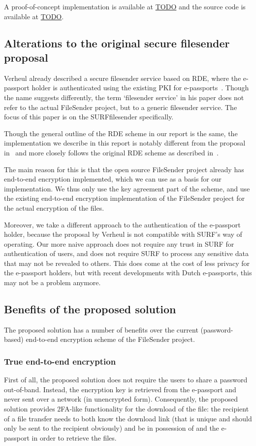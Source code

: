 A proof-of-concept implementation is available at \url{TODO} and the source code is available at \url{TODO}.

\subsection{Alterations to the original secure filesender proposal}\label{subsec:alterations-to-the-rde-scheme}
Verheul already described a secure filesender service based on RDE, where the e-passport holder is authenticated using the existing PKI for e-passports~\cite{verheul2020secure}.
Though the name suggests differently, the term `filesender service' in his paper does not refer to the actual FileSender project, but to a generic filesender service.
The focus of this paper is on the SURFfilesender specifically.

Though the general outline of the RDE scheme in our report is the same, the implementation we describe in this report is notably different from the proposal in~\cite{verheul2020secure} and more closely follows the original RDE scheme as described in~\cite{verheul2017remote}.

The main reason for this is that the open source FileSender project already has end-to-end encryption implemented, which we can use as a basis for our implementation.
We thus only use the key agreement part of the scheme, and use the existing end-to-end encryption implementation of the FileSender project for the actual encryption of the files.

Moreover, we take a different approach to the authentication of the e-passport holder, because the proposal by Verheul is not compatible with SURF's way of operating.
Our more naive approach does not require any trust in SURF for authentication of users, and does not require SURF to process any sensitive data that may not be revealed to others.
This does come at the cost of less privacy for the e-passport holders, but with recent developments with Dutch e-passports, this may not be a problem anymore.

\subsection{Benefits of the proposed solution}\label{subsec:benefits-of-the-proposed-solution}
The proposed solution has a number of benefits over the current (password-based) end-to-end encryption scheme of the FileSender project.

\subsubsection{True end-to-end encryption}\label{subsubsec:true-end-to-end-encryption}
First of all, the proposed solution does not require the users to share a password out-of-band.
Instead, the encryption key is retrieved from the e-passport and never sent over a network (in unencrypted form).
Consequently, the proposed solution provides 2FA-like functionality for the download of the file: the recipient of a file transfer needs to both know the download link (that is unique and should only be sent to the recipient obviously) and be in possession of and the e-passport in order to retrieve the files.

